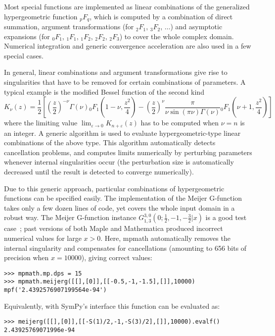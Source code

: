 Most special functions are implemented as linear 
combinations of the generalized hypergeometric function ${}_pF_q$,
which is computed by a combination of direct summation,
argument transformations (for ${}_2F_1$, ${}_3F_2$, $\ldots$)
and asymptotic expansions
(for ${}_0F_1$, ${}_1F_1$, ${}_1F_2$, ${}_2F_2$, ${}_2F_3$)
to cover the whole complex domain.
Numerical integration and generic convergence acceleration
are also used in a few special cases.

In general, linear combinations and argument transformations
give rise to singularities that have to be removed for certain
combinations of parameters.
A typical example is the modified Bessel function of the second kind
$$K_{\nu}(z) = \frac{1}{2} \left[
            \left(\frac{z}{2}\right)^{-\nu}
                \Gamma(\nu)
                {}_0F_1\!\left(1-\nu, \frac{z^2}{4}\right)
             -
             \left(\frac{z}{2}\right)^{\nu}
                 \frac{\pi}{\nu \sin(\pi \nu) \Gamma(\nu)}
                 {}_0F_1\!\left(\nu+1, \frac{z^2}{4}\right)
            \right]$$
where the limiting value $\lim_{\varepsilon \to 0} K_{n+\varepsilon}(z)$
has to be computed when $\nu = n$ is an integer.
A generic algorithm is used to evaluate
hypergeometric-type linear combinations of the above type.
This algorithm automatically detects cancellation problems,
and computes limits numerically by perturbing parameters whenever
internal singularities occur (the perturbation size is automatically
decreased until the result is detected to converge numerically).

Due to this generic approach, particular combinations of hypergeometric
functions can be specified easily.
The implementation of the Meijer G-function takes only a few dozen lines of
code, yet covers the whole input domain in a robust way.
The Meijer G-function instance
$G_{1, 3}^{3, 0}\left(0 ; \tfrac{1}{2}, -1, - \tfrac{3}{2} | x \right)$
is a good test case~\cite{Toth2007}; past versions of both Maple and
Mathematica produced incorrect numerical values for large $x > 0$.
Here, mpmath automatically removes the internal singularity
and compensates for cancellations (amounting to 656 bits
of precision when $x = 10000$), giving correct values:
\begin{verbatim}
>>> mpmath.mp.dps = 15
>>> mpmath.meijerg([[],[0]],[[-0.5,-1,-1.5],[]],10000)
mpf('2.4392576907199564e-94')
\end{verbatim}

Equivalently, with SymPy's interface this function can be evaluated as:
\begin{verbatim}
>>> meijerg([[],[0]],[[-S(1)/2,-1,-S(3)/2],[]],10000).evalf()
2.43925769071996e-94
\end{verbatim}

